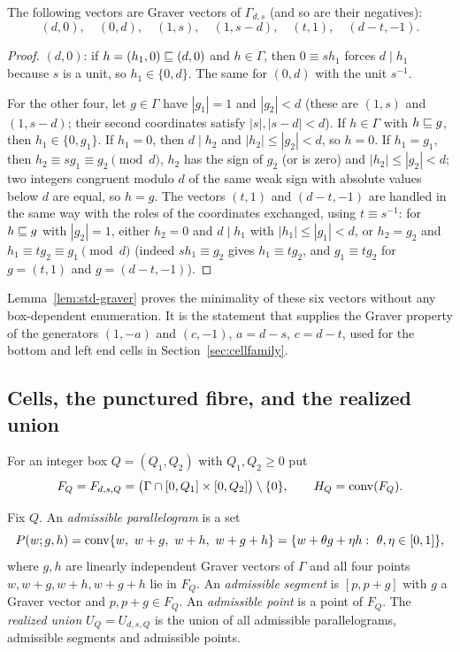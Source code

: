 \begin{lemma}\label{lem:std-graver}
The following vectors are Graver vectors of $\Gamma_{d,s}$ (and so are their negatives):
\[
  (d,0),\quad (0,d),\quad (1,s),\quad (1,s-d),\quad (t,1),\quad (d-t,-1).
\]
\end{lemma}
\begin{proof}
$(d,0)$: if $h=(h_1,0)\sqsubseteq(d,0)$ and $h\in\Gamma$, then $0\equiv sh_1$ forces $d\mid h_1$ because $s$ is a unit, so $h_1\in\{0,d\}$. The same for $(0,d)$ with the unit $s^{-1}$.

For the other four, let $g\in\Gamma$ have $|g_1|=1$ and $|g_2|<d$ (these are $(1,s)$ and $(1,s-d)$; their second coordinates satisfy $|s|,|s-d|<d$). If $h\in\Gamma$ with $h\sqsubseteq g$, then $h_1\in\{0,g_1\}$. If $h_1=0$, then $d\mid h_2$ and $|h_2|\le|g_2|<d$, so $h=0$. If $h_1=g_1$, then $h_2\equiv sg_1\equiv g_2\pmod d$, $h_2$ has the sign of $g_2$ (or is zero) and $|h_2|\le|g_2|<d$; two integers congruent modulo $d$ of the same weak sign with absolute values below $d$ are equal, so $h=g$. The vectors $(t,1)$ and $(d-t,-1)$ are handled in the same way with the roles of the coordinates exchanged, using $t\equiv s^{-1}$: for $h\sqsubseteq g$ with $|g_2|=1$, either $h_2=0$ and $d\mid h_1$ with $|h_1|\le|g_1|<d$, or $h_2=g_2$ and $h_1\equiv tg_2\equiv g_1\pmod d$ (indeed $sh_1\equiv g_2$ gives $h_1\equiv tg_2$, and $g_1\equiv tg_2$ for $g=(t,1)$ and $g=(d-t,-1)$).
\end{proof}

Lemma~\ref{lem:std-graver} proves the minimality of these six vectors without any box-dependent enumeration. It is the statement that supplies the Graver property of the generators $(1,-a)$ and $(c,-1)$, $a=d-s$, $c=d-t$, used for the bottom and left end cells in Section~\ref{sec:cellfamily}.

\subsection{Cells, the punctured fibre, and the realized union}

\begin{definition}\label{def:fibre}
For an integer box $Q=(Q_1,Q_2)$ with $Q_1,Q_2\ge0$ put
\[
  F_Q=F_{d,s,Q}=\bigl(\Gamma\cap[0,Q_1]\times[0,Q_2]\bigr)\setminus\{0\},\qquad H_Q=\operatorname{conv}(F_Q).
\]
\end{definition}

\begin{definition}\label{def:cells}
Fix $Q$. An \emph{admissible parallelogram} is a set
\[
  P(w;g,h)=\operatorname{conv}\{w,\ w+g,\ w+h,\ w+g+h\}
  =\{w+\theta g+\eta h:\ \theta,\eta\in[0,1]\},
\]
where $g,h$ are linearly independent Graver vectors of $\Gamma$ and all four points $w,w+g,w+h,w+g+h$ lie in $F_Q$. An \emph{admissible segment} is $[p,p+g]$ with $g$ a Graver vector and $p,p+g\in F_Q$. An \emph{admissible point} is a point of $F_Q$. The \emph{realized union} $U_Q=U_{d,s,Q}$ is the union of all admissible parallelograms, admissible segments and admissible points.
\end{definition}

